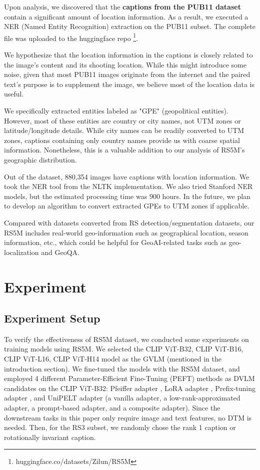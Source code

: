 \documentclass[journal]{IEEEtran}
\begin{document}
Upon analysis, we discovered that the \textbf{captions from the PUB11 dataset} contain a significant amount of location information. As a result, we executed a NER (Named Entity Recognition) extraction on the PUB11 subset. The complete file was uploaded to the huggingface repo \footnote{huggingface.co/datasets/Zilun/RS5M}. 


We hypothesize that the location information in the captions is closely related to the image's content and its shooting location. While this might introduce some noise, given that most PUB11 images originate from the internet and the paired text's purpose is to supplement the image, we believe most of the location data is useful.

We specifically extracted entities labeled as "GPE" (geopolitical entities). However, most of these entities are country or city names, not UTM zones or latitude/longitude details. While city names can be readily converted to UTM zones, captions containing only country names provide us with coarse spatial information. Nonetheless, this is a valuable addition to our analysis of RS5M's geographic distribution.

Out of the dataset, 880,354 images have captions with location information. We took the NER tool from the NLTK implementation. We also tried Stanford NER models, but the estimated processing time was 900 hours. In the future, we plan to develop an algorithm to convert extracted GPEs to UTM zones if applicable.

Compared with datasets converted from RS detection/segmentation datasets, our RS5M includes real-world geo-information such as geographical location, season information, etc., which could be helpful for GeoAI-related tasks such as geo-localization and GeoQA. 

\section{Experiment}


\subsection{Experiment Setup}
To verify the effectiveness of RS5M dataset, we conducted some experiments on training models using RS5M. We selected the CLIP ViT-B\/32, CLIP ViT-B\/16, CLIP ViT-L\/16, CLIP ViT-H\/14 model as the GVLM (mentioned in the introduction section). We fine-tuned the models with the RS5M dataset, and employed 4 different Parameter-Efficient Fine-Tuning (PEFT) methods as DVLM candidates on the CLIP ViT-B\/32: Pfeiffer adapter \cite{pfeiffer2021adapterfusion}, LoRA adapter \cite{hu2021lora}, Prefix-tuning adapter \cite{li2021prefixtuning}, and UniPELT adapter \cite{unipelt} (a vanilla adapter, a low-rank-approximated adapter, a prompt-based adapter, and a composite adapter). Since the downstream tasks in this paper only require image and text features, no DTM is needed. Then, for the RS3 subset, we randomly chose the rank 1 caption or rotationally invariant caption. 
\end{document}
